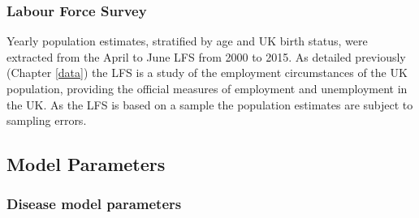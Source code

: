 \documentclass[11pt,twoside]{bristolthesis}
\begin{document}
  \hypertarget{labour-force-survey}{%
  \subsubsection{Labour Force Survey}\label{labour-force-survey}}
  
  Yearly population estimates, stratified by age and UK birth status, were extracted from the April to June LFS from 2000 to 2015. As detailed previously (Chapter \ref{data}) the LFS is a study of the employment circumstances of the UK population, providing the official measures of employment and unemployment in the UK. As the LFS is based on a sample the population estimates are subject to sampling errors.
  
  \hypertarget{model-parameters}{%
  \subsection{Model Parameters}\label{model-parameters}}
  
  \hypertarget{disease-model-parameters}{%
  \subsubsection{Disease model parameters}\label{disease-model-parameters}}
  
\end{document}
